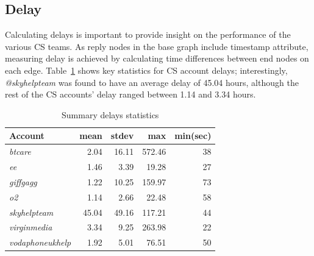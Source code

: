 \documentclass[sigconf]{acmart}
\begin{document}
{%


\subsection{Delay}\label{results_delay}

Calculating delays is important to provide insight on the performance
of the various CS teams. As reply nodes in the base graph include
timestamp attribute, measuring delay is achieved by calculating time
differences between end nodes on each edge. Table~\ref{tbl:delaystats}
shows key statistics for CS account delays; interestingly,
{\emph{@skyhelpteam}} was found to have an average delay of 45.04
hours, although the rest of the CS accounts' delay ranged between 1.14
and 3.34 hours.


\begin{table}[!h]
\centering
\begin{tabularx}{\columnwidth}{lrrrr}
\toprule
\textbf{Account} & \textbf{mean} & \textbf{stdev} & \textbf{max} & \textbf{min(sec)} \\ 
\midrule
{\emph{btcare}} & 2.04 & 16.11 & 572.46 & 38\\
{\emph{ee}} & 1.46 & 3.39 & 19.28 & 27\\
{\emph{giffgagg}} & 1.22 & 10.25 & 159.97 & 73\\ 
{\emph{o2}} & 1.14 & 2.66 & 22.48 & 58\\
{\emph{skyhelpteam}} & 45.04 & 49.16 & 117.21 & 44\\
{\emph{virginmedia}} & 3.34 & 9.25 & 263.98 & 22\\
{\emph{vodaphoneukhelp}} & 1.92 & 5.01 & 76.51 & 50\\
\bottomrule
\end{tabularx}
\caption{Summary delays statistics}
\label{tbl:delaystats}
\end{table}

}
\end{document}
